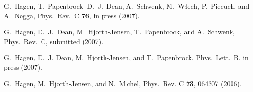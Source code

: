 \documentclass{ws-procs975x65}
\begin{document}
\begin{thebibliography}{10}
G.~Hagen, T.~Papenbrock, D.~J.~Dean, A.~Schwenk, M.~W{\l}och, P.~Piecuch, and
  A.~Nogga, Phys.~Rev.~C {\bf 76}, in press (2007).

G.~Hagen, D.~J.~Dean, M.~Hjorth-Jensen, T.~Papenbrock, and A.~Schwenk, Phys.~Rev.~C, submitted (2007).

G.~Hagen, D.~J. Dean, M.~Hjorth-Jensen, and T.~Papenbrock, Phys.~Lett.~B, in press (2007).

G.~Hagen, M.~Hjorth-Jensen, and N.~Michel, Phys.~Rev. C {\bf 73}, 064307 (2006).
\end{thebibliography}




\end{document}
